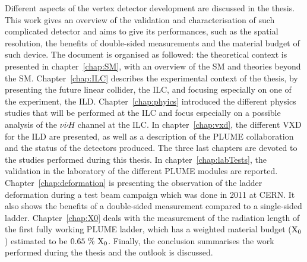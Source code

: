   Different aspects of the vertex detector development are discussed in the thesis.
  This work gives an overview of the validation and characterisation of such complicated detector and aims to give its performances, such as the spatial resolution, the benefits of double-sided measurements and the material budget of such device.
  The document is organised as followed:
  the theoretical context is presented in chapter~\ref{chap:SM}, with an overview of the \gls{SM} and theories beyond the \gls{SM}.
  Chapter~\ref{chap:ILC} describes the experimental context of the thesis, by presenting the future linear collider, the \gls{ILC}, and focusing especially on one of the experiment, the \gls{ILD}.
  Chapter~\ref{chap:phyics} introduced the different physics studies that will be performed at the \gls{ILC} and focus especially on a possible analysis of the $\nu\overline{\nu}H$ channel at the \gls{ILC}.
  In chapter~\ref{chap:vxd}, the different \gls{VXD} for the \gls{ILD} are presented, as well as a description of the \gls{PLUME} collaboration and the status of the detectors produced.
  The three last chapters are devoted to the studies performed during this thesis.
  In chapter~\ref{chap:labTests}, the validation in the laboratory of the different \gls{PLUME} modules are reported.
  Chapter~\ref{chap:deformation} is presenting the observation of the ladder deformation during a test beam campaign which was done in 2011 at CERN. 
  It also shows the benefits of a double-sided measurement compared to a single-sided ladder.
  Chapter~\ref{chap:X0} deals with the measurement of the radiation length of the first fully working \gls{PLUME} ladder, which has a weighted material budget ($\rm{X_0}$) estimated to be $0.65~\%~\rm{X_0}$.
  Finally, the conclusion summarises the work performed during the thesis and the outlook is discussed.
